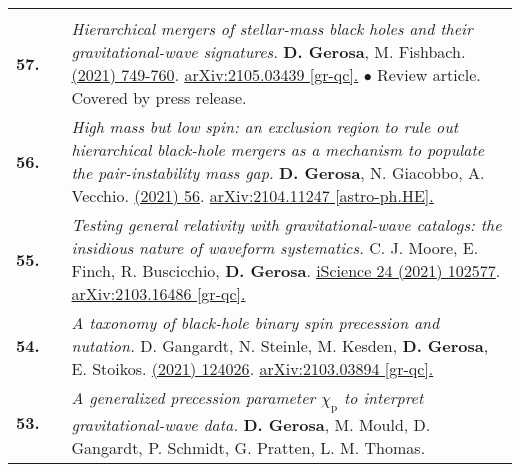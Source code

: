 {\begin{longtable}{rp{0.3cm}p{15.8cm}}
\vspace{0.09cm}\\
%
\textbf{57.} & & \textit{Hierarchical mergers of stellar-mass black holes and their gravitational-wave signatures.}
\newline{}
\textbf{D. Gerosa}, M. Fishbach.
\newline{}
\href{https://www.nature.com/articles/s41550-021-01398-w}{\natastro 5 (2021) 749-760}. \href{https://arxiv.org/abs/2105.03439}{arXiv:2105.03439 [gr-qc].}
\newline{}
\textcolor{color1}{$\bullet$} Review article. Covered by press release.
\vspace{0.09cm}\\
%
\textbf{56.} & & \textit{High mass but low spin: an exclusion region to rule out hierarchical black-hole mergers as a mechanism to populate the pair-instability mass gap.}
\newline{}
\textbf{D. Gerosa}, N. Giacobbo, A. Vecchio.
\newline{}
\href{https://iopscience.iop.org/article/10.3847/1538-4357/ac00bb}{\apj 915 (2021) 56}. \href{https://arxiv.org/abs/2104.11247}{arXiv:2104.11247   [astro-ph.HE].}
\vspace{0.09cm}\\
%
\textbf{55.} & & \textit{Testing general relativity with gravitational-wave catalogs: the insidious nature of waveform systematics.}
\newline{}
C. J. Moore, E. Finch, R. Buscicchio, \textbf{D. Gerosa}.
\newline{}
\href{https://www.sciencedirect.com/science/article/pii/S2589004221005459}{iScience 24 (2021) 102577}. \href{https://arxiv.org/abs/2103.16486}{arXiv:2103.16486   [gr-qc].}
\vspace{0.09cm}\\
%
\textbf{54.} & & \textit{A taxonomy of black-hole binary spin precession and nutation.}
\newline{}
D. Gangardt, N. Steinle, M. Kesden, \textbf{D. Gerosa}, E. Stoikos.
\newline{}
\href{https://journals.aps.org/prd/abstract/10.1103/PhysRevD.103.124026}{\prd 103 (2021) 124026}. \href{https://arxiv.org/abs/2103.03894}{arXiv:2103.03894 [gr-qc].}
\vspace{0.09cm}\\
%
\textbf{53.} & & \textit{A generalized precession parameter $\chi_\mathrm{p}$ to interpret gravitational-wave data.}
\newline{}
\textbf{D. Gerosa}, M. Mould, D. Gangardt, P. Schmidt, G. Pratten, L. M. Thomas.

\end{longtable}}
